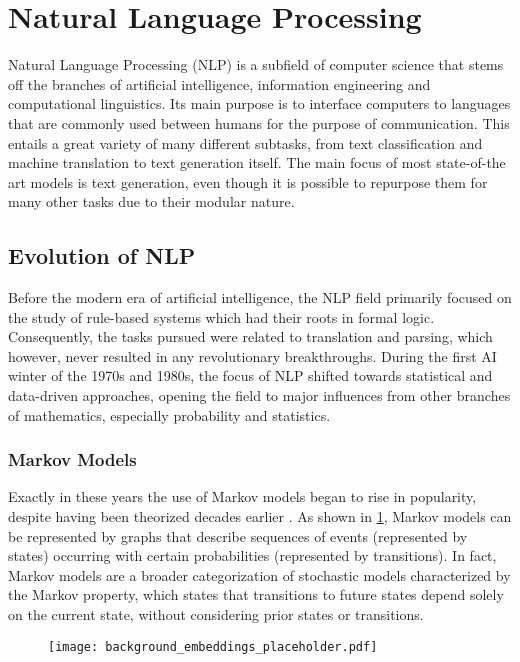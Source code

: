 \section{Natural Language Processing}

Natural Language Processing (NLP) is a subfield of computer science that stems off the branches of artificial intelligence, information engineering and computational linguistics.
Its main purpose is to interface computers to languages that are commonly used between humans for the purpose of communication.
This entails a great variety of many different subtasks, from text classification and machine translation to text generation itself.
The main focus of most state-of-the art models is text generation, even though it is possible to repurpose them for many other tasks due to their modular nature.

\subsection{Evolution of NLP}

Before the modern era of artificial intelligence, the NLP field primarily focused on the study of rule-based systems which had their roots in formal logic.
Consequently, the tasks pursued were related to translation and parsing, which however, never resulted in any revolutionary breakthroughs.
During the first AI winter of the 1970s and 1980s, the focus of NLP shifted towards statistical and data-driven approaches, opening the field to major influences from other branches of mathematics, especially probability and statistics.

\subsubsection*{Markov Models}

Exactly in these years the use of Markov models began to rise in popularity, despite having been theorized decades earlier .
As shown in \cref{fig:background_markov}, Markov models can be represented by graphs that describe sequences of events (represented by states) occurring with certain probabilities (represented by transitions). 
In fact, Markov models are a broader categorization of stochastic models characterized by the Markov property, which states that transitions to future states depend solely on the current state, without considering prior states or transitions.

\begin{figure}[t!]
    \centering
    \texttt{[image: background\_embeddings\_placeholder.pdf]}
    \caption{}
    \label{fig:background_markov}
\end{figure}


